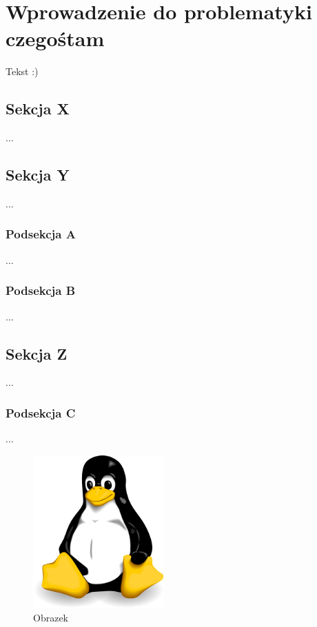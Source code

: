 
\chapter{Wprowadzenie do problematyki czegośtam}
\label{chapter:background}

Tekst :)

\section{Sekcja X}

...

\section{Sekcja Y}

...

\subsection{Podsekcja A}

...

\subsection{Podsekcja B}

...

\section{Sekcja Z}

...

\subsection{Podsekcja C}

...

\begin{figure}[ht]
	\begin{center}
		\includegraphics[width=5cm]{foto}
	\end{center}
	\caption{Obrazek}
	\label{etykieta_obrazka}
\end{figure}

